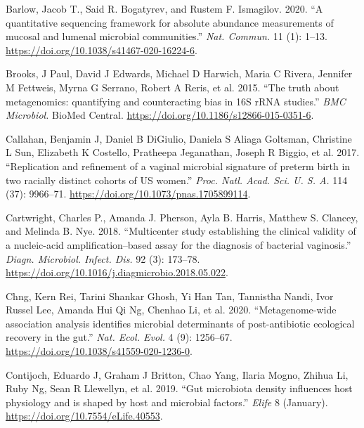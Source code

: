 \documentclass[
]{article}
\newlength{\cslhangindent}
\newlength{\cslentryspacingunit} %
\newenvironment{CSLReferences}[2] %
 {%
  \setlength{\parindent}{0pt}
  \ifodd #1
  \let\oldpar\par
  \def\par{\hangindent=\cslhangindent\oldpar}
  \fi
  \setlength{\parskip}{#2\cslentryspacingunit}
 }%
 {}
\begin{document}
\hypertarget{refs}{}
\begin{CSLReferences}{1}{0}
\leavevmode{}%
Barlow, Jacob T., Said R. Bogatyrev, and Rustem F. Ismagilov. 2020. {``{A quantitative sequencing framework for absolute abundance measurements of mucosal and lumenal microbial communities}.''} \emph{Nat. Commun.} 11 (1): 1--13. \url{https://doi.org/10.1038/s41467-020-16224-6}.

\leavevmode{}%
Brooks, J Paul, David J Edwards, Michael D Harwich, Maria C Rivera, Jennifer M Fettweis, Myrna G Serrano, Robert A Reris, et al. 2015. {``{The truth about metagenomics: quantifying and counteracting bias in 16S rRNA studies}.''} \emph{BMC Microbiol.} BioMed Central. \url{https://doi.org/10.1186/s12866-015-0351-6}.

\leavevmode{}%
Callahan, Benjamin J, Daniel B DiGiulio, Daniela S Aliaga Goltsman, Christine L Sun, Elizabeth K Costello, Pratheepa Jeganathan, Joseph R Biggio, et al. 2017. {``{Replication and refinement of a vaginal microbial signature of preterm birth in two racially distinct cohorts of US women}.''} \emph{Proc. Natl. Acad. Sci. U. S. A.} 114 (37): 9966--71. \url{https://doi.org/10.1073/pnas.1705899114}.

\leavevmode{}%
Cartwright, Charles P., Amanda J. Pherson, Ayla B. Harris, Matthew S. Clancey, and Melinda B. Nye. 2018. {``{Multicenter study establishing the clinical validity of a nucleic-acid amplification--based assay for the diagnosis of bacterial vaginosis}.''} \emph{Diagn. Microbiol. Infect. Dis.} 92 (3): 173--78. \url{https://doi.org/10.1016/j.diagmicrobio.2018.05.022}.

\leavevmode{}%
Chng, Kern Rei, Tarini Shankar Ghosh, Yi Han Tan, Tannistha Nandi, Ivor Russel Lee, Amanda Hui Qi Ng, Chenhao Li, et al. 2020. {``{Metagenome-wide association analysis identifies microbial determinants of post-antibiotic ecological recovery in the gut}.''} \emph{Nat. Ecol. Evol.} 4 (9): 1256--67. \url{https://doi.org/10.1038/s41559-020-1236-0}.

\leavevmode{}%
Contijoch, Eduardo J, Graham J Britton, Chao Yang, Ilaria Mogno, Zhihua Li, Ruby Ng, Sean R Llewellyn, et al. 2019. {``{Gut microbiota density influences host physiology and is shaped by host and microbial factors}.''} \emph{Elife} 8 (January). \url{https://doi.org/10.7554/eLife.40553}.


\end{CSLReferences}
\end{document}
